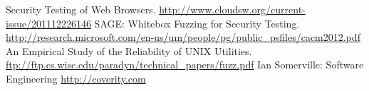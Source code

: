 
\begin{thebibliography}{9}
        Security Testing of Web Browsers. \url{http://www.cloudsw.org/current-issue/201112226146}
        SAGE: Whitebox Fuzzing for Security Testing. \url{http://research.microsoft.com/en-us/um/people/pg/public\_psfiles/cacm2012.pdf}
        An Empirical Study of the Reliability of UNIX Utilities. \url{ftp://ftp.cs.wisc.edu/paradyn/technical\_papers/fuzz.pdf}
         Ian Somerville: Software Engineering
         \url{http://coverity.com}
\end{thebibliography}
